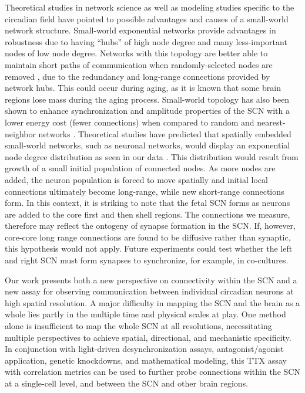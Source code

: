 Theoretical studies in network science as well as modeling studies specific to the circadian field have pointed to possible advantages and causes of a small-world network structure.
Small-world exponential networks provide advantages in robustness due to having ``hubs'' of high node degree and many less-important nodes of low node degree.
Networks with this topology are better able to maintain short paths of communication when randomly-selected nodes are removed \cite{Albert2002}, due to the redundancy and long-range connections provided by network hubs.
This could occur during aging, as it is known that some brain regions lose mass during the aging process.
Small-world topology has also been shown to enhance synchronization and amplitude properties of the SCN with a lower energy cost (fewer connections) when compared to random and nearest-neighbor networks \cite{Vasalou2009, Hafner2012}.
Theoretical studies have predicted that spatially embedded small-world networks, such as neuronal networks, would display an exponential node degree distribution as seen in our data \cite{Ozik2004, Zitin2014}.
This distribution would result from growth of a small initial population of connected nodes.
As more nodes are added, the neuron population is forced to move spatially and initial local connections ultimately become long-range, while new short-range connections form.
In this context, it is striking to note that the fetal SCN forms as neurons are added to the core first and then shell regions. The connections we measure, therefore may reflect the ontogeny of synapse formation in the SCN. 
If, however, core-core long range connections are found to be diffusive rather than synaptic, this hypothesis would not apply.
Future experiments could test whether the left and right SCN must form synapses to synchronize, for example, in co-cultures.

Our work presents both a new perspective on connectivity within the SCN and a new assay for observing communication between individual circadian neurons at high spatial resolution.
A major difficulty in mapping the SCN and the brain as a whole lies partly in the multiple time and physical scales at play.
One method alone is insufficient to map the whole SCN at all resolutions, necessitating multiple perspectives to achieve spatial, directional, and mechanistic specificity.
In conjunction with light-driven desynchronization assays, antagonist/agonist application, genetic knockdowns, and mathematical modeling, this TTX assay with correlation metrics can be used to further probe connections within the SCN at a single-cell level, and between the SCN and other brain regions.

